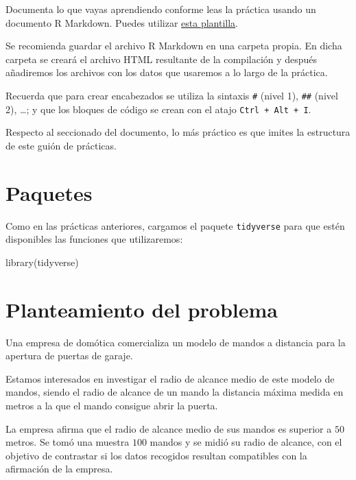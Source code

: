 \documentclass[
  title=normal,
  notoc,
  nobib,
  degree=mecinf]{mnye}
\newenvironment{Shaded}{\begin{snugshade}}{\end{snugshade}}
\newcommand{\FunctionTok}[1]{\textcolor[rgb]{0.00,0.00,0.00}{#1}}
\newcommand{\NormalTok}[1]{#1}
\begin{document}
Documenta lo que vayas aprendiendo conforme leas la práctica usando un documento R Markdown. Puedes utilizar \href{https://drive.google.com/uc?id=1t9pjP_1Kjo8wgtav_I6hPHXxb5BqTIrc\&export=download}{esta plantilla}.

Se recomienda guardar el archivo R Markdown en una carpeta propia. En dicha carpeta se creará el archivo \textsf{HTML} resultante de la compilación y después añadiremos los archivos con los datos que usaremos a lo largo de la práctica.

Recuerda que para crear encabezados se utiliza la sintaxis \texttt{\#} (nivel 1), \texttt{\#\#} (nivel 2), \ldots; y que los bloques de código se crean con el atajo \texttt{Ctrl\ +\ Alt\ +\ I}.

Respecto al seccionado del documento, lo más práctico es que imites la estructura de este guión de prácticas.

\hypertarget{packages}{%
\section{Paquetes}\label{packages}}

Como en las prácticas anteriores, cargamos el paquete \texttt{tidyverse} para que estén disponibles las funciones que utilizaremos:

\begin{Shaded}
\begin{Highlighting}[]
\FunctionTok{library}\NormalTok{(tidyverse)}
\end{Highlighting}
\end{Shaded}

\hypertarget{problem}{%
\section{Planteamiento del problema}\label{problem}}

\begin{ebox}{}
Una empresa de domótica comercializa un modelo de mandos a distancia para la apertura de puertas de garaje.

Estamos interesados en investigar el radio de alcance medio de este modelo de mandos, siendo el radio de alcance de un mando la distancia máxima medida en metros a la que el mando consigue abrir la puerta.

La empresa afirma que el radio de alcance medio de sus mandos es superior a \(50\) metros. Se tomó una muestra \(100\) mandos y se midió su radio de alcance, con el objetivo de contrastar si los datos recogidos resultan compatibles con la afirmación de la empresa.

\end{ebox}
\end{document}

